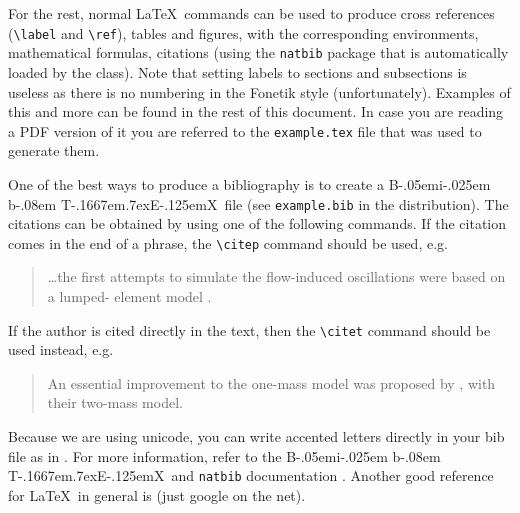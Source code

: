 \documentclass{fonetik}
\newcommand{\BibTeX}{{\rm B\kern-.05em{\sc i\kern-.025em b}\kern-.08em
    T\kern-.1667em\lower.7ex\hbox{E}\kern-.125emX}}
\begin{document}
For the rest, normal \LaTeX\ commands can be used to produce cross
references (\verb|\label| and \verb|\ref|), tables and figures, with
the corresponding environments, mathematical formulas, citations
(using the \verb|natbib| package that is automatically loaded by the
class). Note that setting labels to sections and subsections is
useless as there is no numbering in the Fonetik style
(unfortunately). Examples of this and more can be found in the rest of
this document. In case you are reading a PDF version of it
you are referred to the \verb|example.tex| file that was used to
generate them.

One of the best ways to produce a bibliography is to create a \BibTeX\
file (see \verb|example.bib| in the distribution). The citations can be
obtained by using one of the following commands. If the citation comes
in the end of a phrase, the \verb|\citep| command should be used,
e.g.
\begin{quote}
\ldots{}the first attempts to simulate the flow-induced oscillations
were based on a lumped- element model \citep{SmartAndSmarter68}.
\end{quote}
 If the author is cited directly in the text,
then the \verb|\citet| command should be used instead, e.g.
\begin{quote}
An essential improvement to the one-mass model was proposed by
\citet{DullAndMean98}, with their two-mass model.
\end{quote}
Because we are using unicode, you can write accented letters directly in your bib file as in \citep{accented}.
For more information, refer to the \BibTeX\ and {\tt natbib}
documentation \citep[e.g.][ch. 13]{companion}. Another good reference for
\LaTeX\ in general is \citep{short} (just google on the net).
\end{document}
